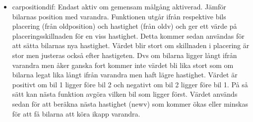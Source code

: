 \begin{itemize}
      \item car\textunderscore position\textunderscore dif: Endast aktiv om gemensam målgång aktiverad. Jämför bilarnas position med varandra. Funktionen utgår ifrån respektive bils placering (från old\textunderscore position) och hastighet (från old\textunderscore v) 
och ger ett värde på placeringsskillnaden för en viss hastighet. Detta kommer
sedan användas för att sätta bilarnas nya hastighet. Värdet blir stort om skillnaden i placering är stor men justeras också efter hastigeten. Dvs om bilarna ligger långt ifrån varandra men åker ganska fort kommer inte värdet bli lika stort som om bilarna legat lika långt ifrån varandra men haft lägre hastighet. Värdet är positivt om bil 1 ligger före bil 2 och negativt om bil 2 ligger före bil 1. På så sätt kan nästa funktion avgöra vilken bil som ligger först.
Värdet används sedan för att beräkna nästa hastighet (new\textunderscore v) som kommer ökas eller minskas för att få bilarna att köra ikapp varandra. 


\end{itemize}
